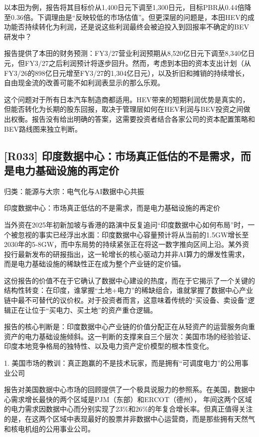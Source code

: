 \documentclass[11pt]{ctexart}
\begin{document}
以本田为例，报告将其目标价从1,400日元下调至1,300日元，目标PBR从0.44倍降至0.36倍。下调理由是“反映较低的市场估值”。但更深层的问题是，本田HEV的成功能否持续转化为利润，还是说这些利润最终会被迫投入到回报率不确定的BEV研发中？

报告提供了本田的财务预测：FY3/27营业利润预期从8,520亿日元下调至8,340亿日元，但FY3/27之后利润预计将逐步回升。然而，考虑到本田的资本支出计划（从FY3/26的898亿日元增至FY3/27的1,304亿日元），以及折旧和摊销的持续增长，自由现金流的改善可能不如利润表显示的那么乐观。

这个问题对于所有日本汽车制造商都适用。HEV带来的短期利润优势是真实的，但能否转化为长期的股东回报，取决于管理层如何在HEV利润与BEV投资之间做出权衡。报告没有给出明确的答案，这需要投资者结合各家公司的资本配置策略和BEV路线图来独立判断。

\subsection{[R033] 印度数据中心：市场真正低估的不是需求，而是电力基础设施的再定价}
{\small\color{refgray}归类：能源与大宗：电气化与AI数据中心共振}

印度数据中心：市场真正低估的不是需求，而是电力基础设施的再定价

当外资在2025年初新加坡与香港的路演中反复追问“印度数据中心如何布局”时，一个被忽视的事实已经浮出水面：印度数据中心容量预计将从当前的1.5GW增长至2030年的5-8GW，而中东局势的持续紧张正在将这一数字推向区间上沿。某外资投行最新发布的研报指出，这一轮增长的核心驱动力并非AI算力的爆发性需求，而是电力基础设施的稀缺性正在成为整个产业链的定价锚。

这份报告的价值不在于它确认了数据中心建设的热度，而在于它揭示了一个关键的结构性转变：在印度，谁掌握“土地+电力”的稀缺组合，谁就掌握了数据中心产业链中最不可替代的议价权。对于投资者而言，这意味着传统的“买设备、卖设备”逻辑正在让位于“买电力、买土地”的资产重仓逻辑。

报告的核心判断是：印度数据中心产业链的价值分配正在从轻资产的运营服务向重资产的电力基础设施倾斜。这一判断的支撑来自三个层次：美国市场的经验验证、印度本地竞争格局的独特性、以及电力资产定价模型的根本性变化。

1. 美国市场的教训：真正跑赢的不是技术玩家，而是拥有“可调度电力”的公用事业公司

报告对美国数据中心市场的回顾提供了一个极具说服力的参照系。在美国，数据中心需求增长最快的两个区域是PJM（东部）和ERCOT（德州）， 年间这两个区域的电力需求因数据中心而分别实现了23\%和26\%的年复合增长率。但真正值得关注的是，在这两个区域中表现最好的股票并非数据中心运营商，而是那些拥有天然气和核电机组的公用事业公司。
\end{document}
